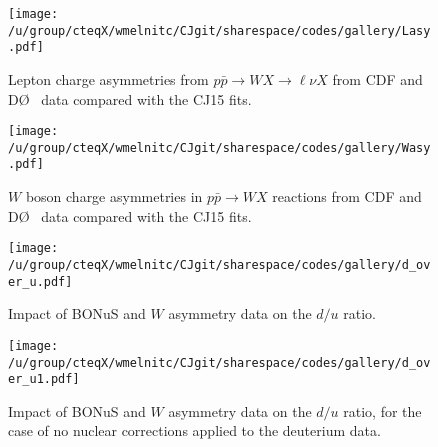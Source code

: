 \documentclass[aps,prd,amsmath,preprint]{revtex4}
\begin{document}
\begin{figure}[t]
\texttt{[image: /u/group/cteqX/wmelnitc/CJgit/sharespace/codes/gallery/Lasy.pdf]}
\caption{Lepton charge asymmetries from $p\bar p \to W X \to \ell \nu X$
	from CDF \cite{CDF_l} and D\O\ \cite{D0_mu, D0_l} data compared
	with the CJ15 fits.}
\label{fig:Lasy}
\end{figure} 

  
\begin{figure}[t]
\texttt{[image: /u/group/cteqX/wmelnitc/CJgit/sharespace/codes/gallery/Wasy.pdf]}
\caption{$W$ boson charge asymmetries in $p\bar p \to W X$ reactions
	from CDF \cite{CDF_W} and D\O\ \cite{D0_W} data compared with
	the CJ15 fits.}
\label{fig:Wasy}
\end{figure} 




\begin{figure}[t]
\texttt{[image: /u/group/cteqX/wmelnitc/CJgit/sharespace/codes/gallery/d\_over\_u.pdf]}
\caption{Impact of BONuS \cite{BONuS} and $W$ asymmetry data
	on the $d/u$ ratio.}
\label{fig:du}
\end{figure} 


\begin{figure}[t]
\texttt{[image: /u/group/cteqX/wmelnitc/CJgit/sharespace/codes/gallery/d\_over\_u1.pdf]}
\caption{Impact of BONuS \cite{BONuS} and $W$ asymmetry data
	on the $d/u$ ratio, for the case of no nuclear corrections
	applied to the deuterium data.}
\label{fig:du1}
\end{figure} 
\end{document}
